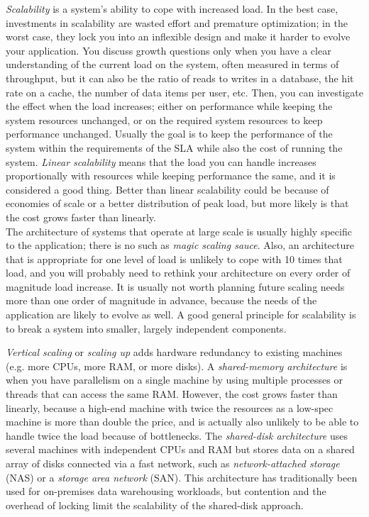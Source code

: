\documentclass[table, xcdraw]{article}%
\begin{document}
\textit{Scalability} is a system’s ability to cope with increased load. In the best case, investments in scalability are wasted effort and premature optimization; in the worst case, they lock you into an inflexible design and make it harder to evolve your application. You discuss growth questions only when you have a clear understanding of the current load on the system, often measured in terms of throughput, but it can also be the ratio of reads to writes in a database, the hit rate on a cache, the number of data items per user, etc. Then, you can investigate the effect when the load increases; either on performance while keeping the system resources unchanged, or on the required system resources to keep performance unchanged. Usually the goal is to keep the performance of the system within the requirements of
the SLA while also the cost of running the system. \textit{Linear scalability} means that the load you can handle increases proportionally with resources while keeping performance the same, and it is considered a good thing. Better than linear scalability could be because of economies of scale or a better distribution of peak load, but more likely is that the cost grows faster than linearly.\\
The architecture of systems that operate at large scale is usually highly specific to the application; there is no such as \textit{magic scaling sauce}. Also, an architecture that is appropriate for one level of load is unlikely to cope with 10 times that load, and you will probably need to rethink your architecture on every order of magnitude load increase. It is usually not worth planning future scaling needs more than one order of magnitude in advance, because the needs of the application are likely to evolve as well. A good general principle for scalability is to break a system into smaller, largely independent components.

\textit{Vertical scaling} or \textit{scaling up} adds hardware redundancy to existing machines (e.g. more CPUs, more RAM, or more disks). A \textit{shared-memory architecture} is when you have parallelism on a single machine by using multiple processes or threads that can access the same RAM. However, the cost grows faster than linearly, because a high-end machine with twice the resources as a low-spec machine is more than double the price, and is actually also unlikely to be able to handle twice the load because of bottlenecks. The \textit{shared-disk architecture} uses several machines with independent CPUs and RAM but stores data on a shared array of disks connected via a fast network, such as \textit{network-attached storage} (NAS) or a \textit{storage area network} (SAN). This architecture has traditionally been used for on-premises data warehousing workloads, but contention and the overhead of locking limit the scalability of the shared-disk approach.
\end{document}
